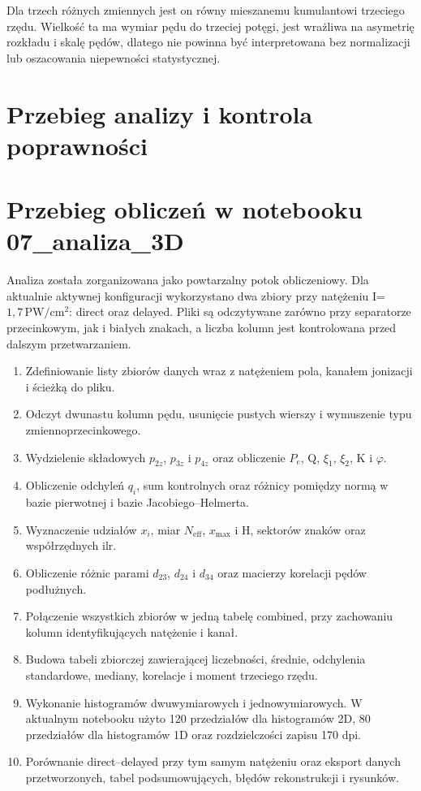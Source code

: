 \documentclass[12pt,letterpaper,oneside]{report}
\numberwithin{equation}{chapter}
\numberwithin{figure}{chapter}
\numberwithin{table}{chapter}
\newcommand{\Pe}{\ensuremath{P_e}}
\newcommand{\Neff}{\ensuremath{N_{\mathrm{eff}}}}
\newcommand{\xmax}{\ensuremath{x_{\max}}}
\begin{document}
Dla trzech różnych zmiennych jest on równy mieszanemu kumulantowi
trzeciego rzędu. Wielkość ta ma wymiar pędu do trzeciej potęgi, jest
wrażliwa na asymetrię rozkładu i skalę pędów, dlatego nie powinna być
interpretowana bez normalizacji lub oszacowania niepewności
statystycznej.

\section{Przebieg analizy i kontrola poprawności}
\section{Przebieg obliczeń w notebooku 07\_analiza\_3D}

Analiza została zorganizowana jako powtarzalny potok obliczeniowy. Dla
aktualnie aktywnej konfiguracji wykorzystano dwa zbiory przy natężeniu
I=\ensuremath{1{,}7\,\mathrm{PW/cm^2}}: direct oraz delayed. Pliki są odczytywane zarówno przy
separatorze przecinkowym, jak i białych znakach, a liczba kolumn jest
kontrolowana przed dalszym przetwarzaniem.

\begin{enumerate}
\def\labelenumi{\arabic{enumi}.}
\item
  Zdefiniowanie listy zbiorów danych wraz z natężeniem pola, kanałem
  jonizacji i ścieżką do pliku.
\item
  Odczyt dwunastu kolumn pędu, usunięcie pustych wierszy i wymuszenie
  typu zmiennoprzecinkowego.
\item
  Wydzielenie składowych \ensuremath{p_{2z}}, \ensuremath{p_{3z}} i \ensuremath{p_{4z}} oraz obliczenie \Pe{}, Q, \ensuremath{\xi_1}, \ensuremath{\xi_2},
  K i \ensuremath{\varphi}.
\item
  Obliczenie odchyleń \ensuremath{q_i}, sum kontrolnych oraz różnicy pomiędzy normą w
  bazie pierwotnej i bazie Jacobiego--Helmerta.
\item
  Wyznaczenie udziałów \ensuremath{x_i}, miar \Neff{}, \xmax{} i H, sektorów znaków oraz
  współrzędnych ilr.
\item
  Obliczenie różnic parami \ensuremath{d_{23}}, \ensuremath{d_{24}} i \ensuremath{d_{34}} oraz macierzy korelacji pędów
  podłużnych.
\item
  Połączenie wszystkich zbiorów w jedną tabelę combined, przy zachowaniu
  kolumn identyfikujących natężenie i kanał.
\item
  Budowa tabeli zbiorczej zawierającej liczebności, średnie, odchylenia
  standardowe, mediany, korelacje i moment trzeciego rzędu.
\item
  Wykonanie histogramów dwuwymiarowych i jednowymiarowych. W aktualnym
  notebooku użyto 120 przedziałów dla histogramów 2D, 80 przedziałów dla
  histogramów 1D oraz rozdzielczości zapisu 170 dpi.
\item
  Porównanie direct--delayed przy tym samym natężeniu oraz eksport
  danych przetworzonych, tabel podsumowujących, błędów rekonstrukcji i
  rysunków.
\end{enumerate}
\end{document}
